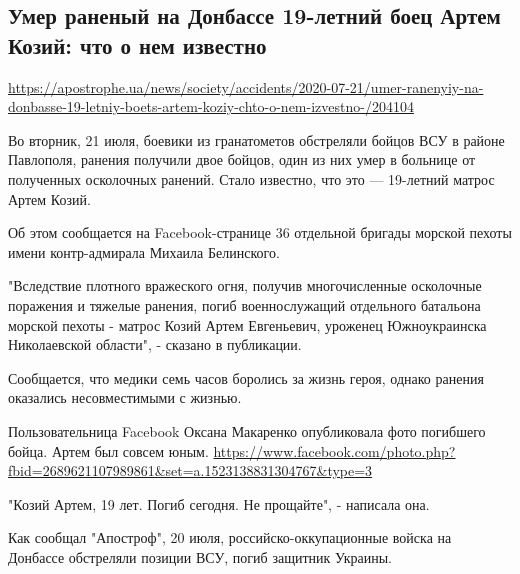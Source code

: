  
 

\clearpage
\def\sectitle{Умер раненый на Донбассе 19-летний боец Артем Козий: что о нем известно}
\subsection{\sectitle}
\label{sec:21_07_2020.kozii.1}
\url{https://apostrophe.ua/news/society/accidents/2020-07-21/umer-ranenyiy-na-donbasse-19-letniy-boets-artem-koziy-chto-o-nem-izvestno-/204104}


Во вторник, 21 июля, боевики из гранатометов обстреляли бойцов ВСУ в районе
Павлополя, ранения получили двое бойцов, один из них умер в больнице от
полученных осколочных ранений. Стало известно, что это --- 19-летний матрос Артем
Козий.

Об этом сообщается на Facebook-странице 36 отдельной бригады морской пехоты
имени контр-адмирала Михаила Белинского.

"Вследствие плотного вражеского огня, получив многочисленные осколочные
поражения и тяжелые ранения, погиб военнослужащий отдельного батальона морской
пехоты - матрос Козий Артем Евгеньевич, уроженец Южноукраинска Николаевской
области", - сказано в публикации. 

Сообщается, что медики семь часов боролись за жизнь героя, однако ранения
оказались несовместимыми с жизнью.

Пользовательница Facebook Оксана Макаренко опубликовала фото погибшего бойца.
Артем был совсем юным. \url{https://www.facebook.com/photo.php?fbid=2689621107989861&set=a.1523138831304767&type=3}


"Козий Артем, 19 лет. Погиб сегодня. Не прощайте", - написала она.

Как сообщал "Апостроф", 20 июля, российско-оккупационные войска на Донбассе
обстреляли позиции ВСУ, погиб защитник Украины. 
